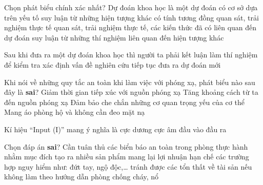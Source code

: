 \begin{ex}
	Chọn phát biểu chính xác nhất? Dự đoán khoa học là một dự đoán có cơ sở dựa trên yếu tố
	\choice
	{suy luận từ những hiện tượng khác có tính tương đồng}
	{quan sát, trải nghiệm thực tế}
	{\True quan sát, trải nghiệm thực tế, các kiến thức đã có liên quan đến dự đoán}
	{suy luận từ những thí nghiệm liên quan đến hiện tượng khác}
	\loigiai{}
\end{ex}

\begin{ex}
	Sau khi đưa ra một dự đoán khoa học thì người ta phải
	\choice
	{kết luận}
	{\True làm thí nghiệm để kiểm tra}
	{xác định vấn đề nghiên cứu}
	{tiếp tục đưa ra dự đoán mới}
	\loigiai{}
\end{ex}

\begin{ex}
	Khi nói về những quy tắc an toàn khi làm việc với phóng xạ, phát biểu nào sau đây là \textbf{sai}?
	\choice
	{Giảm thời gian tiếp xúc với nguồn phóng xạ}
	{Tăng khoảng cách từ ta đến nguồn phóng xạ}
	{Đảm bảo che chắn những cơ quan trọng yếu của cơ thể}
	{\True Mang áo phòng hộ và không cần đeo mặt nạ}
	\loigiai{}
\end{ex}

\begin{ex}
	Kí hiệu “Input (I)” mang ý nghĩa là
	\choice
	{cực dương}
	{cực âm}
	{\True đầu vào}
	{đầu ra}
	\loigiai{}
\end{ex}

\begin{ex}
	Chọn đáp án \textbf{sai}? Cần tuân thủ các biển báo an toàn trong phòng thực hành nhằm mục đích
	\choice
	{\True tạo ra nhiều sản phẩm mang lại lợi nhuận}
	{hạn chế các trường hợp nguy hiểm như: đứt tay, ngộ độc,…}
	{tránh được các tổn thất về tài sản nếu không làm theo hướng dẫn}
	{phòng chống cháy, nổ}
	\loigiai{}
\end{ex}

